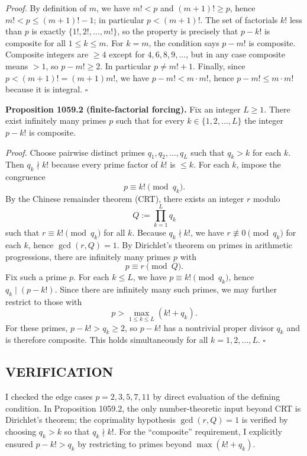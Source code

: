 \emph{Proof.}
By definition of $m$, we have $m!<p$ and $(m+1)!\ge p$, hence $m!<p\le (m+1)!-1$; in particular $p<(m+1)!$.
The set of factorials $k!$ less than $p$ is exactly $\{1!,2!,\dots,m!\}$, so the property is precisely that $p-k!$ is composite for all $1\le k\le m$.
For $k=m$, the condition says $p-m!$ is composite. Composite integers are $\ge 4$ except for $4,6,8,9,\dots$, but in any case composite means $>1$, so $p-m!\ge 2$. In particular $p\neq m!+1$.
Finally, since $p<(m+1)!=(m+1)m!$, we have $p-m!<m\cdot m!$, hence $p-m!\le m\cdot m!$ because it is integral. \hfill$\square$

\medskip
\textbf{Proposition 1059.2 (finite-factorial forcing).}
Fix an integer $L\ge 1$. There exist infinitely many primes $p$ such that for every $k\in\{1,2,\dots,L\}$ the integer $p-k!$ is composite.

\emph{Proof.}
Choose pairwise distinct primes $q_1,q_2,\dots,q_L$ such that $q_k>k$ for each $k$. Then $q_k\nmid k!$ because every prime factor of $k!$ is $\le k$.
For each $k$, impose the congruence
\[
p\equiv k!\pmod{q_k}.
\]
By the Chinese remainder theorem (CRT), there exists an integer $r$ modulo
\[
Q:=\prod_{k=1}^L q_k
\]
such that $r\equiv k!\pmod{q_k}$ for all $k$.
Because $q_k\nmid k!$, we have $r\not\equiv 0\pmod{q_k}$ for each $k$, hence $\gcd(r,Q)=1$.
By Dirichlet's theorem on primes in arithmetic progressions, there are infinitely many primes $p$ with
\[
p\equiv r\pmod{Q}.
\]
Fix such a prime $p$. For each $k\le L$, we have $p\equiv k!\pmod{q_k}$, hence $q_k\mid (p-k!)$.
Since there are infinitely many such primes, we may further restrict to those with
\[
p>\max_{1\le k\le L}(k!+q_k).
\]
For these primes, $p-k!>q_k\ge 2$, so $p-k!$ has a nontrivial proper divisor $q_k$ and is therefore composite.
This holds simultaneously for all $k=1,2,\dots,L$. \hfill$\square$

\subsection*{VERIFICATION}
I checked the edge cases $p=2,3,5,7,11$ by direct evaluation of the defining condition. In Proposition 1059.2, the only number-theoretic input beyond CRT is Dirichlet's theorem; the coprimality hypothesis $\gcd(r,Q)=1$ is verified by choosing $q_k>k$ so that $q_k\nmid k!$.
For the ``composite'' requirement, I explicitly ensured $p-k!>q_k$ by restricting to primes beyond $\max(k!+q_k)$.

